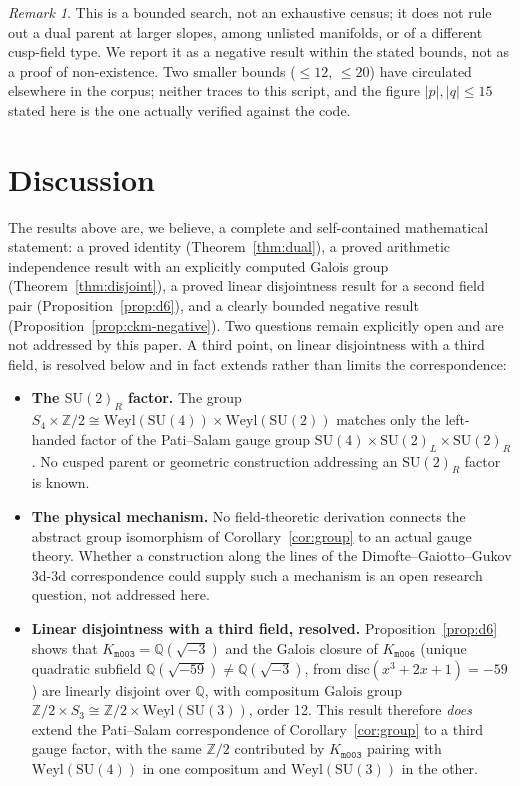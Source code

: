 \documentclass[11pt,a4paper]{article}
\theoremstyle{definition}
\theoremstyle{remark}
\newtheorem{remark}[theorem]{Remark}
\newcommand{\Z}{\mathbb{Z}}
\newcommand{\Q}{\mathbb{Q}}
\newcommand{\mfld}[1]{\texttt{#1}}
\newcommand{\SU}{\mathrm{SU}}
\newcommand{\Weyl}{\mathrm{Weyl}}
\newcommand{\disc}{\mathrm{disc}}
\begin{document}
\begin{remark}
This is a bounded search, not an exhaustive census; it does not
rule out a dual parent at larger slopes, among unlisted manifolds,
or of a different cusp-field type. We report it as a negative
result within the stated bounds, not as a proof of non-existence.
Two smaller bounds ($\le 12$, $\le 20$) have circulated elsewhere
in the corpus; neither traces to this script, and the figure
$|p|,|q|\le 15$ stated here is the one actually verified against
the code.
\end{remark}

\section{Discussion}\label{sec:discussion}

The results above are, we believe, a complete and self-contained
mathematical statement: a proved identity (Theorem~\ref{thm:dual}),
a proved arithmetic independence result with an explicitly computed
Galois group (Theorem~\ref{thm:disjoint}), a proved linear
disjointness result for a second field pair (Proposition~\ref{prop:d6}),
and a clearly bounded negative result (Proposition~\ref{prop:ckm-negative}).
Two questions remain explicitly open and are not addressed by this
paper. A third point, on linear disjointness with a third field,
is resolved below and in fact extends rather than limits the
correspondence:

\begin{itemize}
\item \textbf{The $\SU(2)_R$ factor.} The group
$S_4\times\Z/2\cong\Weyl(\SU(4))\times\Weyl(\SU(2))$ matches only
the left-handed factor of the Pati--Salam gauge group
$\SU(4)\times\SU(2)_L\times\SU(2)_R$. No cusped parent or geometric
construction addressing an $\SU(2)_R$ factor is known.

\item \textbf{The physical mechanism.} No field-theoretic
derivation connects the abstract group isomorphism of
Corollary~\ref{cor:group} to an actual gauge theory. Whether a
construction along the lines of the Dimofte--Gaiotto--Gukov 3d-3d
correspondence \cite{DGG} could supply such a mechanism is an
open research question, not addressed here.

\item \textbf{Linear disjointness with a third field, resolved.}
Proposition~\ref{prop:d6} shows that $K_{\mfld{m003}}=\Q(\sqrt{-3})$
and the Galois closure of $K_{\mfld{m006}}$ (unique quadratic
subfield $\Q(\sqrt{-59})\ne\Q(\sqrt{-3})$, from
$\disc(x^3+2x+1)=-59$) are linearly disjoint over $\Q$, with
compositum Galois group $\Z/2\times S_3\cong\Z/2\times\Weyl(\SU(3))$,
order 12. This result therefore \emph{does} extend
the Pati--Salam correspondence of Corollary~\ref{cor:group} to a
third gauge factor, with the same $\Z/2$ contributed by
$K_{\mfld{m003}}$ pairing with $\Weyl(\SU(4))$ in one compositum
and $\Weyl(\SU(3))$ in the other.
\end{itemize}
\end{document}
